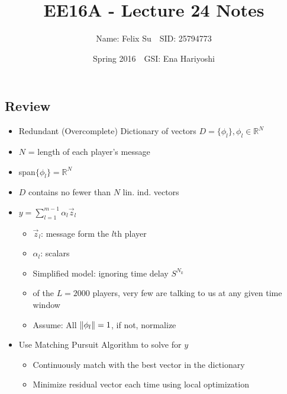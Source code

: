 \documentclass{article}\usepackage{amsmath,amssymb,amsthm,tikz,tkz-graph,color,chngpage,soul,hyperref,csquotes,graphicx,floatrow,framed,scrextend,mathtools,mathrsfs}\newcommand*{\QEDB}{\hfill\ensuremath{\square}}\newtheorem*{prop}{Proposition}\renewcommand{\theenumi}{\alph{enumi}}\usepackage[shortlabels]{enumitem}\usepackage[nobreak=true]{mdframed}\usetikzlibrary{matrix,calc}\MakeOuterQuote{"}\usepackage[margin=0.75in]{geometry} \newtheorem{theorem}{Theorem}\newcommand{\Z}{\mathbb Z}\newcommand{\R}{\mathbb R}\newcommand{\Q}{\mathbb Q}\newcommand{\N}{\mathbb N}\newcommand{\x}[1]{\textrm{#1}}\newcommand{\xs}[1]{\textrm{ #1 }}\newcommand{\pr}{\textrm{Pr}}
\title{EE16A - Lecture 24 Notes}
\author{Name: Felix Su$\quad$SID: 25794773}
\date{Spring 2016$\quad$GSI: Ena Hariyoshi}
\newcommand{\sumlim}[3]{\sum\limits_{#1}^{#2}#3}
\newcommand{\set}[1]{\{#1\}}
\DeclarePairedDelimiter{\norm}{\lVert}{\rVert}
\newcommand{\items}[1]{\begin{itemize}#1\end{itemize}}
\begin{document}
\maketitle

\subsection*{Review}
\items{
    \item Redundant (Overcomplete) Dictionary of vectors $D=\set{\phi_l},\phi_l\in\R^N$
    \item $N$ = length of each player's message
    \item span$\set{\phi_l}=\R^N$
    \item $D$ contains no fewer than $N$ lin. ind. vectors
    \item $y=\sumlim{l=1}{m-1}{\alpha_l\vec{z}_l}$
    \items{
        \item $\vec{z}_l$: message form the $l$th player
        \item $\alpha_l$: scalars
        \item Simplified model: ignoring time delay $S^{N_k}$
        \item of the $L=2000$ players, very few are talking to us at any given time window
        \item Assume: All $\norm{\phi_l}=1$, if not, normalize
    }
    \item Use Matching Pursuit Algorithm to solve for $y$
    \items{
        \item Continuously match with the best vector in the dictionary
        \item Minimize residual vector each time using local optimization
    }
}
\end{document}
